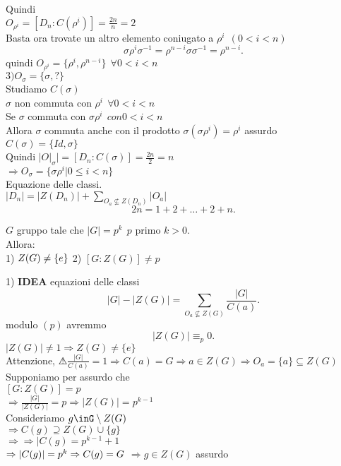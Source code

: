 \documentclass[12px]{article}
\begin{document}
\begin{dimo}
		 Quindi \\
		 $O_{\rho^i} = [D_n:C(\rho^i)] = \frac{2n}n = 2$ \\
		 Basta ora trovate un altro elemento coniugato a $\rho^i \ \ (0<i<n)$
		  \[
			  \sigma\rho^i\sigma^{-1} = \rho^{n-i}\sigma\sigma^{-1} = \rho^{n-i}
		 .\] 
		 quindi $O_{\rho^i} = \{\rho^i, \rho^{n-i}\} \ \ \forall 0< i< n$\\
		 $3) O_\sigma = \{\sigma, ?\}$\\
		 Studiamo $C(\sigma)$\\
		  $\sigma$ non commuta con $\rho^i \ \ \forall 0 < i  <n$\\
		  Se $\sigma$ commuta con $\sigma\rho^i \ \ con 0<i<n$\\
		  Allora  $\sigma$ commuta anche con il prodotto $\sigma(\sigma\rho^i) = \rho^i$ assurdo \lightning \\
		  $C(\sigma) = \{Id, \sigma\}$\\
		  Quindi  $|O|_\sigma| = [D_n:C(\sigma)] = \frac{2n}2 = n$\\
		  $ \Rightarrow O_\sigma = \{\sigma\rho^i | 0\leq i < n\}$\\
		  Equazione delle classi.\\
		  $|D_n| = |Z(D_n)| + \sum_{O_a\not\subseteq Z(D_n)}|O_a|$\\
		   \[
		  2n = 1 + 2 + \ldots + 2 + n
		  .\] 



	\end{dimo}
	\begin{teo}
		$G$ gruppo tale che $|G| = p^k \ \ p$ primo $k>0$.\\
		Allora:\\
		1) $Z(G)\neq \{e\}\\$
		2) $[G:Z(G)] \neq p$
	\end{teo}
	\begin{dimo}
		1) \textbf{IDEA} equazioni delle classi
		\[
			|G| - |Z(G)| = \sum_{O_a\not\subseteq Z(G)}\frac{|G|}{C(a)}
		.\] 
		modulo  $(p)$ avremmo
		 \[
		|Z(G)|\equiv_p 0 
		.\] 
		$|Z(G)| \neq 1 \Rightarrow Z(G) \neq \{e\}$ \\
		Attenzione, $\warning \frac {|G|}{C(a)} = 1 \Rightarrow C(a) = G \Rightarrow a\in Z(G) \Rightarrow O_a = \{a\}\subseteq Z(G)$\\
		Supponiamo per assurdo che\\
		$[G:Z(G)] = p$ \\
		$ \Rightarrow \frac{|G|}{|Z(G)|} = p \Rightarrow |Z(G)| = p^{k-1}$ \\
		Consideriamo $g\inG\setminus Z(G)$\\
		$ \Rightarrow C(g)\supseteq Z(G)\cup \{g\}$ \\
		$ \Rightarrow  \Rightarrow |C(g) = p^{k-1} + 1$ \\
		$ \Rightarrow |C(g)| = p^k \Rightarrow C(g) = G\\$ 
		$ \Rightarrow g\in Z(G)$ assurdo
	\end{dimo}
\end{document}

